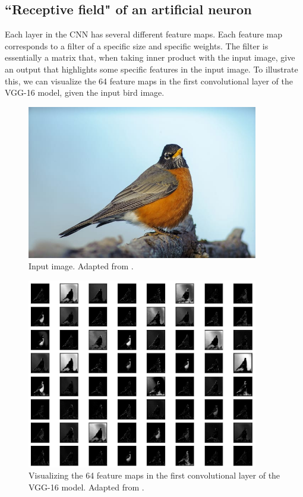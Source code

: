 \subsection{``Receptive field" of an artificial neuron}
Each layer in the CNN has several different feature maps. Each feature map corresponds to a filter of a specific size and specific weights. The filter is essentially a matrix that, when taking inner product with the input image, give an output that highlights some specific features in the input image. To illustrate this, we can visualize the 64 feature maps in the first convolutional layer of the VGG-16 model, given the input bird image.
\begin{figure}[H]
        \centering
            \includegraphics[width=0.9\textwidth]{figures/artificial/bird.jpg}
            \caption{Input image. Adapted from \cite{feature_map}.}
    \end{figure}
\begin{figure}[H]
        \centering
            \includegraphics[width=0.9\textwidth]{figures/artificial/feature_map_vgg16.png}
            \caption{Visualizing the 64 feature maps in the first convolutional layer of the VGG-16 model. Adapted from \cite{feature_map}.}
    \end{figure}
    
